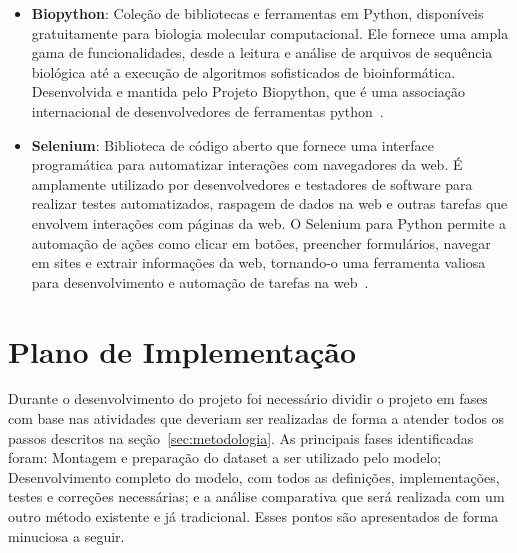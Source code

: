 \begin{itemize}
  \item \textbf{Biopython}: Coleção de bibliotecas e ferramentas em Python, disponíveis gratuitamente para biologia molecular computacional. Ele fornece uma ampla gama de funcionalidades, desde a leitura e análise de arquivos de sequência biológica até a execução de algoritmos sofisticados de bioinformática. Desenvolvida e mantida pelo Projeto Biopython, que é uma associação internacional de desenvolvedores de ferramentas python~\cite{biopython}.
  \item \textbf{Selenium}: Biblioteca de código aberto que fornece uma interface programática para automatizar interações com navegadores da web. É amplamente utilizado por desenvolvedores e testadores de software para realizar testes automatizados, raspagem de dados na web e outras tarefas que envolvem interações com páginas da web. O Selenium para Python permite a automação de ações como clicar em botões, preencher formulários, navegar em sites e extrair informações da web, tornando-o uma ferramenta valiosa para desenvolvimento e automação de tarefas na web~\cite{selenium-python}.
\end{itemize}


\section{Plano de Implementação}
Durante o desenvolvimento do projeto foi necessário dividir o projeto em fases com base nas atividades que deveriam ser realizadas de forma a atender todos os passos descritos na seção~\ref{sec:metodologia}. As principais fases identificadas foram: Montagem e preparação do dataset a ser utilizado pelo modelo; Desenvolvimento completo do modelo, com todos as definições, implementações, testes e correções necessárias; e a análise comparativa que será realizada com um outro método existente e já tradicional. Esses pontos são apresentados de forma minuciosa a seguir.

